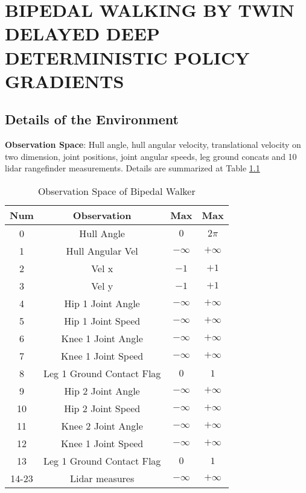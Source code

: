 \chapter{BIPEDAL WALKING BY TWIN DELAYED DEEP DETERMINISTIC POLICY GRADIENTS}
\label{chap:exp_setup}

\section{Details of the Environment}

\textbf{Observation Space}: Hull angle, hull angular velocity, translational velocity on two dimension, joint positions, joint angular speeds, leg ground concats and 10 lidar rangefinder measurements. Details are summarized at Table \ref{table:bpw_obs_space}

\begin{table}[h!]
	\begin{center}
	\begin{tabular}{cccc}
		\textbf{Num} & \textbf{Observation} & \textbf{Max} & \textbf{Max} \\
		\hline
		0  & Hull Angle & $0$ & $2\pi$ \\
		1  & Hull Angular Vel & $-\infty$ & $+\infty$ \\
		2  & Vel x & $-1$ & $+1$ \\
		3  & Vel y & $-1$ & $+1$ \\
		4  & Hip 1 Joint Angle & $-\infty$ & $+\infty$ \\
		5  & Hip 1 Joint Speed & $-\infty$ & $+\infty$ \\
		6  & Knee 1 Joint Angle & $-\infty$ & $+\infty$ \\
		7  & Knee 1 Joint Speed & $-\infty$ & $+\infty$ \\
		8  & Leg 1 Ground Contact Flag & $0$ & $1$ \\
		9  & Hip 2 Joint Angle & $-\infty$ & $+\infty$ \\
		10  & Hip 2 Joint Speed & $-\infty$ & $+\infty$ \\
		11  & Knee 2 Joint Angle & $-\infty$ & $+\infty$ \\
		12  & Knee 1 Joint Speed & $-\infty$ & $+\infty$ \\
		13  & Leg 1 Ground Contact Flag & $0$ & $1$ \\
		14-23  & Lidar measures  & $-\infty$ & $+\infty$
	\end{tabular}
	\end{center}
	\caption{Observation Space of Bipedal Walker}
	\label{table:bpw_obs_space}
\end{table}

